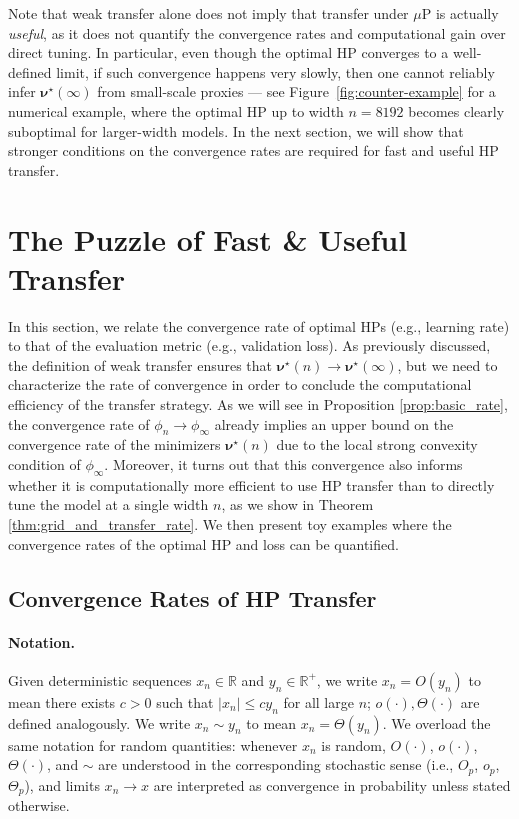 \documentclass{article} %
\newcommand{\bhp}{\bm{\nu}}                       %
\begin{document}
Note that weak transfer alone does not imply that transfer under $\mu$P is actually \emph{useful}, as it does not quantify the convergence rates and computational gain over direct tuning. In particular, even though the optimal HP converges to a well-defined limit, if such convergence happens very slowly, then one cannot reliably infer $\bhp^\star(\infty)$ from small-scale proxies --- see Figure~\ref{fig:counter-example} for a numerical example, where the optimal HP up to width $n=8192$ becomes clearly suboptimal for larger-width models.  
In the next section, we will show that stronger conditions on the convergence rates are required for fast and useful HP transfer. 

\section{The Puzzle of Fast \& Useful Transfer}\label{sec:useful-transfer}
\vspace{-1.mm}
 
In this section, we relate the convergence rate of optimal HPs (e.g., learning rate) to that of the evaluation metric (e.g., validation loss). 
As previously discussed, the definition of weak transfer ensures that $\bhp^\star(n) \to \bhp^\star(\infty)$, but we need to characterize the rate of convergence in order to conclude the computational efficiency of the transfer strategy. As we will see in Proposition \ref{prop:basic_rate}, the convergence rate of $\phi_n \to \phi_\infty$ already implies an upper bound on the convergence rate of the minimizers $\bhp^\star(n)$ due to the local strong convexity condition of $\phi_\infty$. Moreover, it turns out that this convergence also informs whether it is computationally more efficient to use HP transfer than to directly tune the model at a single width $n$, as we show in Theorem \ref{thm:grid_and_transfer_rate}. We then present toy examples where the convergence rates of the optimal HP and loss can be quantified. 

\vspace{-1.2mm}
\subsection{Convergence Rates of HP Transfer}\label{sec:hp-asymptotics}
\vspace{-1.mm}

\paragraph{Notation.}
Given deterministic sequences $x_n \in \mathbb{R}$ and $y_n \in \mathbb{R}^+$, we write $x_n = O(y_n)$ to mean there exists $c > 0$ such that $|x_n| \leq c y_n$ for all large $n$; $o(\cdot), \Theta(\cdot)$ are defined analogously. We write $x_n \sim y_n$ to mean $x_n = \Theta(y_n)$. We overload the same notation for random quantities: whenever $x_n$ is random, $O(\cdot)$, $o(\cdot)$, $\Theta(\cdot)$, and $\sim$ are understood in the corresponding stochastic sense (i.e., $O_p$, $o_p$, $\Theta_p$), and limits $x_n \to x$ are interpreted as convergence in probability unless stated otherwise.
\end{document}
